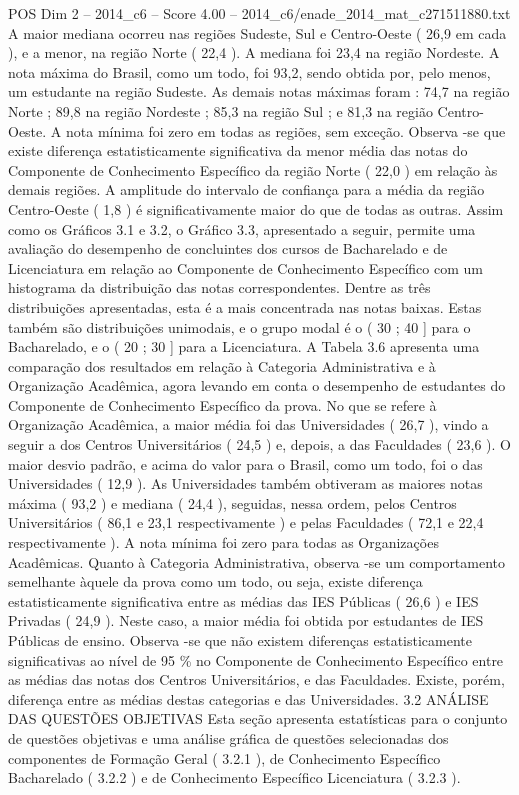 \begin{textsample}{POS Dim 2 – 2014\_c6 – Score 4.00 – 2014\_c6/enade\_2014\_mat\_c271511880.txt}
A maior mediana ocorreu nas regiões Sudeste, Sul e Centro-Oeste ( 26,9 em cada ), e a menor, na região Norte ( 22,4 ).
A mediana foi 23,4 na região Nordeste.
A nota máxima do Brasil, como um todo, foi 93,2, sendo obtida por, pelo menos, um estudante na região Sudeste.
As demais notas máximas foram : 74,7 na região Norte ; 89,8 na região Nordeste ; 85,3 na região Sul ; e 81,3 na região Centro-Oeste.
A nota mínima foi zero em todas as regiões, sem exceção.
Observa -se que existe diferença estatisticamente significativa da menor média das notas do Componente de Conhecimento Específico da região Norte ( 22,0 ) em relação às demais regiões.
A amplitude do intervalo de confiança para a média da região Centro-Oeste ( 1,8 ) é significativamente maior do que de todas as outras.
Assim como os Gráficos 3.1 e 3.2, o Gráfico 3.3, apresentado a seguir, permite uma avaliação do desempenho de concluintes dos cursos de Bacharelado e de Licenciatura em relação ao Componente de Conhecimento Específico com um histograma da distribuição das notas correspondentes.
Dentre as três distribuições apresentadas, esta é a mais concentrada nas notas baixas.
Estas também são distribuições unimodais, e o grupo modal é o ( 30 ; 40 ] para o Bacharelado, e o ( 20 ; 30 ] para a Licenciatura.
A Tabela 3.6 apresenta uma comparação dos resultados em relação à Categoria Administrativa e à Organização Acadêmica, agora levando em conta o desempenho de estudantes do Componente de Conhecimento Específico da prova.
No que se refere à Organização Acadêmica, a maior média foi das Universidades ( 26,7 ), vindo a seguir a dos Centros Universitários ( 24,5 ) e, depois, a das Faculdades ( 23,6 ).
O maior desvio padrão, e acima do valor para o Brasil, como um todo, foi o das Universidades ( 12,9 ).
As Universidades também obtiveram as maiores notas máxima ( 93,2 ) e mediana ( 24,4 ), seguidas, nessa ordem, pelos Centros Universitários ( 86,1 e 23,1 respectivamente ) e pelas Faculdades ( 72,1 e 22,4 respectivamente ).
A nota mínima foi zero para todas as Organizações Acadêmicas.
Quanto à Categoria Administrativa, observa -se um comportamento semelhante àquele da prova como um todo, ou seja, existe diferença estatisticamente significativa entre as médias das IES Públicas ( 26,6 ) e IES Privadas ( 24,9 ).
Neste caso, a maior média foi obtida por estudantes de IES Públicas de ensino.
Observa -se que não existem diferenças estatisticamente significativas ao nível de 95 \% no Componente de Conhecimento Específico entre as médias das notas dos Centros Universitários, e das Faculdades.
Existe, porém, diferença entre as médias destas categorias e das Universidades. 3.2 ANÁLISE DAS QUESTÕES OBJETIVAS Esta seção apresenta estatísticas para o conjunto de questões objetivas e uma análise gráfica de questões selecionadas dos componentes de Formação Geral ( 3.2.1 ), de Conhecimento Específico Bacharelado ( 3.2.2 ) e de Conhecimento Específico Licenciatura ( 3.2.3 ).

\end{textsample}
